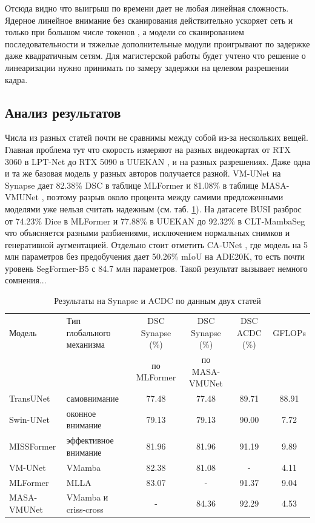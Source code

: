 \documentclass[areasetadvanced]{scrartcl}
\begin{document}
		Отсюда видно что выигрыш по времени дает не любая линейная сложность. Ядерное линейное внимание без сканирования действительно ускоряет сеть и
		только при большом числе токенов \cite{lsnet, rtlinearformer}, а модели со сканированием последовательности \cite{snakerwkv, masavmunet} и
		тяжелые дополнительные модули \cite{uuekan} проигрывают по задержке даже квадратичным сетям. Для магистерской работы будет учтено что решение о линеаризации
		нужно принимать по замеру задержки на целевом разрешении кадра.

	\subsection{Анализ результатов}
		Числа из разных статей почти не сравнимы между собой из-за нескольких вещей. Главная проблема тут что скорость измеряют на разных видеокартах от RTX 3060 в
		LPT-Net \cite{lptnet} до RTX 5090 в UUEKAN \cite{uuekan}, и на разных разрешениях. Даже одна и та же базовая модель у разных авторов получается
		разной. VM-UNet на Synapse дает 82.38\% DSC в таблице MLFormer \cite{mlformer} и 81.08\% в таблице MASA-VMUNet \cite{masavmunet}, поэтому разрыв
		около процента между самими предложенными моделями уже нельзя считать надежным (см. таб. \ref{tab:synapse}). На датасете BUSI разброс 
		от 74.23\% Dice в MLFormer \cite{mlformer} и 77.88\% в UUEKAN \cite{uuekan} до 92.32\% в CLT-MambaSeg \cite{cltmambaseg} что объясняется разными
		разбиениями, исключением нормальных снимков и генеративной аугментацией. Отдельно стоит отметить CA-UNet \cite{caunet}, где модель на 5 млн
		параметров без предобучения дает 50.26\% mIoU на ADE20K, то есть почти уровень SegFormer-B5 \cite{segformer} с 84.7 млн параметров. Такой
		результат вызывает немного сомнения...

		\begin{table}[H]
			\centering
			\footnotesize
			\caption{Результаты на Synapse и ACDC по данным двух статей \cite{mlformer, masavmunet}}
			\label{tab:synapse}
			\begin{tabular}{llcccc}
				\toprule
				Модель & Тип глобального механизма & DSC Synapse (\%) & DSC Synapse (\%) & DSC ACDC (\%) & GFLOPs \\
				 & & по MLFormer & по MASA-VMUNet & & \\
				\midrule
				TransUNet & самовнимание & 77.48 & 77.48 & 89.71 & 88.91 \\
				Swin-UNet & оконное внимание & 79.13 & 79.13 & 90.00 & 7.72 \\
				MISSFormer & эффективное внимание & 81.96 & 81.96 & 91.19 & 9.89 \\
				VM-UNet & VMamba & 82.38 & 81.08 & - & 4.11 \\
				MLFormer & MLLA & 83.07 & - & 91.37 & 9.04 \\
				MASA-VMUNet & VMamba и criss-cross & - & 84.36 & 92.29 & 4.53 \\
				\bottomrule
			\end{tabular}
		\end{table}
\end{document}
